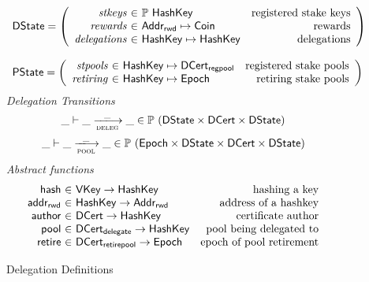 \documentclass[11pt,a4paper]{article}
\newcommand{\powerset}[1]{\mathbb{P}~#1}
\newcommand{\var}[1]{\mathit{#1}}
\newcommand{\fun}[1]{\mathsf{#1}}
\newcommand{\type}[1]{\mathsf{#1}}
\newcommand{\trans}[2]{\xlongrightarrow[\textsc{#1}]{#2}}
\newcommand{\AddrRWD}{\type{Addr_{rwd}}}
\newcommand{\VKey}{\type{VKey}}
\newcommand{\HashKey}{\type{HashKey}}
\newcommand{\Coin}{\type{Coin}}
\newcommand{\Epoch}{\type{Epoch}}
\newcommand{\DState}{\type{DState}}
\newcommand{\PState}{\type{PState}}
\newcommand{\DCert}{\type{DCert}}
\newcommand{\DCertDeleg}{\type{DCert_{delegate}}}
\newcommand{\DCertRegPool}{\type{DCert_{regpool}}}
\newcommand{\DCertRetirePool}{\type{DCert_{retirepool}}}
\begin{document}
\begin{figure}
\begin{equation*}
\begin{array}{l}
    \DState =
    \left(\begin{array}{r@{~\in~}lr}
      \var{stkeys} & \powerset \HashKey & \text{registered stake keys}\\
      \var{rewards} & \AddrRWD \mapsto \Coin & \text{rewards}\\
      \var{delegations} & \HashKey \mapsto \HashKey & \text{delegations}\\
    \end{array}\right)
    \\
    \\
    \PState =
    \left(\begin{array}{r@{~\in~}lr}
      \var{stpools} & \HashKey \mapsto \DCertRegPool & \text{registered stake pools}\\
      \var{retiring} & \HashKey \mapsto \Epoch & \text{retiring stake pools}\\
    \end{array}\right)
    \end{array}
  \end{equation*}
  \emph{Delegation Transitions}
  \begin{equation*}
    \_ \vdash \_ \trans{deleg}{\_} \_ \in
      \powerset (\DState \times \DCert \times \DState)
  \end{equation*}
  \begin{equation*}
    \_ \vdash \_ \trans{pool}{\_} \_ \in
      \powerset (\Epoch \times \DState \times \DCert \times \DState)
  \end{equation*}
  \emph{Abstract functions}
  \begin{equation*}
  \begin{array}{r@{~\in~}lr}
  \fun{hash} & \VKey \to \HashKey
  & \text{hashing a key}
  \\
  \fun{addr_{rwd}} & \HashKey \to \AddrRWD
  & \text{address of a hashkey}
  \\
  \fun{author} & \DCert \to \HashKey
  & \text{certificate author}
  \\
  \fun{pool} & \DCertDeleg \to \HashKey
  & \text{pool being delegated to}
  \\
  \fun{retire} & \DCertRetirePool \to \Epoch
  & \text{epoch of pool retirement}
  \end{array}
  \end{equation*}
  
  \caption{Delegation Definitions}
  \label{fig:delegation-definitons}
\end{figure}
\end{document}
